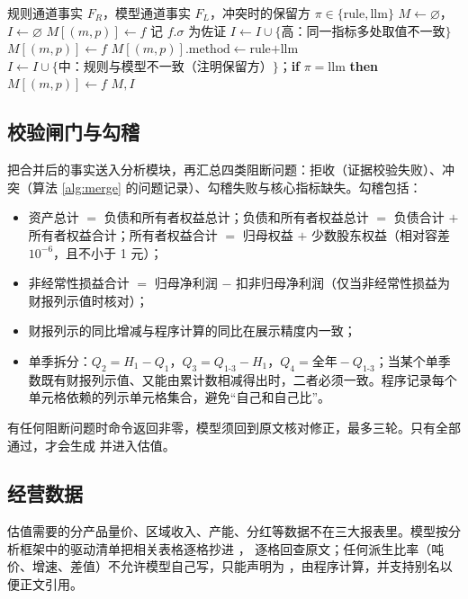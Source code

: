 \begin{algorithm}[t]
\caption{双通道合并（）}
\label{alg:merge}
\small
\begin{algorithmic}[1]
\Require 规则通道事实 $F_R$，模型通道事实 $F_L$，冲突时的保留方 $\pi\in\{\text{rule},\text{llm}\}$
\State $M\gets\varnothing$，$I\gets\varnothing$
   $M[(m,p)]\gets f$
   记 $f.\sigma$ 为佐证
  \Else{} $I\gets I\cup\{\text{高：同一指标多处取值不一致}\}$
  \EndIf
\EndFor
{}
   $M[(m,p)]\gets f$
   $M[(m,p)].\text{method}\gets\text{rule+llm}$
  \Else{} $I\gets I\cup\{\text{中：规则与模型不一致（注明保留方）}\}$；\textbf{if} $\pi=\text{llm}$ \textbf{then} $M[(m,p)]\gets f$
  \EndIf
\EndFor
\State \Return $M, I$ 
\end{algorithmic}
\end{algorithm}

\subsection{校验闸门与勾稽}
 把合并后的事实送入分析模块，再汇总四类阻断问题：拒收（证据校验失败）、冲突（算法 \ref{alg:merge} 的问题记录）、勾稽失败与核心指标缺失。勾稽包括：
\begin{itemize}
  \item 资产总计 $=$ 负债和所有者权益总计；负债和所有者权益总计 $=$ 负债合计 $+$ 所有者权益合计；所有者权益合计 $=$ 归母权益 $+$ 少数股东权益（相对容差 $10^{-6}$，且不小于 1 元）；
  \item 非经常性损益合计 $=$ 归母净利润 $-$ 扣非归母净利润（仅当非经常性损益为财报列示值时核对）；
  \item 财报列示的同比增减与程序计算的同比在展示精度内一致；
  \item 单季拆分：$Q_2=H_1-Q_1$，$Q_3=Q_{1\text{-}3}-H_1$，$Q_4=\text{全年}-Q_{1\text{-}3}$；当某个单季数既有财报列示值、又能由累计数相减得出时，二者必须一致。程序记录每个单元格依赖的列示单元格集合，避免“自己和自己比”。
\end{itemize}
有任何阻断问题时命令返回非零，模型须回到原文核对修正，最多三轮。只有全部通过，才会生成  并进入估值。

\subsection{经营数据}
估值需要的分产品量价、区域收入、产能、分红等数据不在三大报表里。模型按分析框架中的驱动清单把相关表格逐格抄进 ， 逐格回查原文；任何派生比率（吨价、增速、差值）不允许模型自己写，只能声明为 ，由程序计算，并支持别名以便正文引用。
